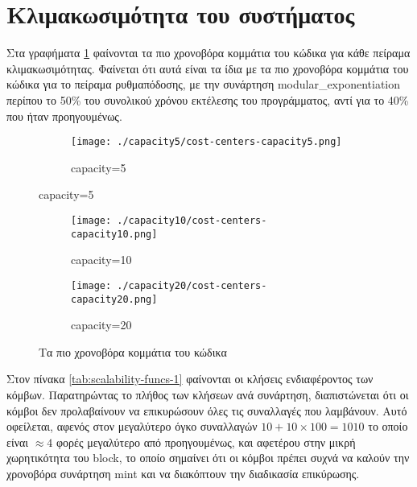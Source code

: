 \documentclass{article}
\newcommand{\eng}[1]{\foreignlanguage{english}{#1}} %
\begin{document}
\clearpage
\section{Κλιμακωσιμότητα του συστήματος}

Στα γραφήματα \ref{fig:scalability-cost-centers} φαίνονται τα πιο χρονοβόρα
κομμάτια του κώδικα για κάθε πείραμα κλιμακωσιμότητας. Φαίνεται ότι αυτά είναι
τα ίδια με τα πιο χρονοβόρα κομμάτια του κώδικα για το πείραμα ρυθμαπόδοσης,
με την συνάρτηση \eng{modular\_exponentiation} περίπου το 50\% του συνολικού
χρόνου εκτέλεσης του προγράμματος, αντί για το 40\% που ήταν προηγουμένως.

\graphicspath{{../experiments/profiled\_outputs/scalabilitydel100ms/}}

\begin{figure}[ht]
    \centering
    \begin{subfigure}{\textwidth}
        \texttt{[image: ./capacity5/cost-centers-capacity5.png]}
        \caption{\eng{capacity=5}}
    \end{subfigure}
\end{figure}
\begin{figure}[ht]
    \ContinuedFloat
    \begin{subfigure}{\textwidth}
        \texttt{[image: ./capacity10/cost-centers-capacity10.png]}
        \caption{\eng{capacity=10}}
    \end{subfigure}
    \begin{subfigure}{\textwidth}
        \texttt{[image: ./capacity20/cost-centers-capacity20.png]}
        \caption{\eng{capacity=20}}
    \end{subfigure}
    \caption{Τα πιο χρονοβόρα κομμάτια του κώδικα}
    \label{fig:scalability-cost-centers}
\end{figure}
\FloatBarrier


Στον πίνακα \ref{tab:scalability-funcs-1} φαίνονται οι κλήσεις ενδιαφέροντος
των κόμβων. Παρατηρώντας το πλήθος των κλήσεων ανά συνάρτηση, διαπιστώνεται ότι
οι κόμβοι δεν προλαβαίνουν να επικυρώσουν όλες τις συναλλαγές που λαμβάνουν.
Αυτό οφείλεται, αφενός στον μεγαλύτερο όγκο συναλλαγών $10 + 10 \times 100 =
1010$ το οποίο είναι $\approx 4$ φορές μεγαλύτερο από προηγουμένως, και
αφετέρου στην μικρή χωρητικότητα του \eng{block}, το οποίο σημαίνει ότι οι
κόμβοι πρέπει συχνά να καλούν την χρονοβόρα συνάρτηση \eng{mint} και να
διακόπτουν την διαδικασία επικύρωσης.
\end{document}
